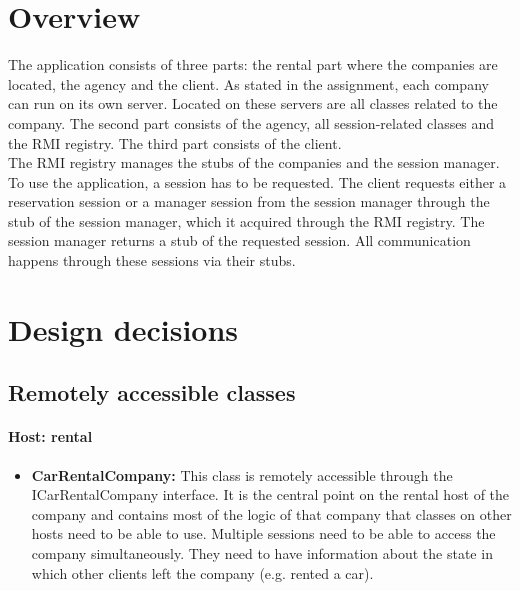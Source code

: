 \documentclass[10pt,a4paper]{article}
\begin{document}
\section{Overview}
The application consists of three parts: the rental part where the companies are located, the agency and the client. 
As stated in the assignment, each company can run on its own server. Located on these servers are all classes related to the company. The second part consists of the agency, all session-related classes and the RMI registry. The third part consists of the client.\\
The RMI registry manages the stubs of the companies and the session manager. To use the application, a session has to be requested. The client requests either a reservation session or a manager session from the session manager through the stub of the session manager, which it acquired through the RMI registry. The session manager returns a stub of the requested session. All communication happens through these sessions via their stubs. 


\section{Design decisions}
\subsection{Remotely accessible classes}


\paragraph{Host: rental}
\begin{itemize}
\item \textbf{CarRentalCompany:} This class is remotely accessible through the ICarRentalCompany interface. It is the central point on the rental host of the company and contains most of the logic of that company that classes on other hosts need to be able to use. Multiple sessions need to be able to access the company simultaneously. They need to have information about the state in which other clients left the company (e.g. rented a car).
\end{itemize}
\end{document}
